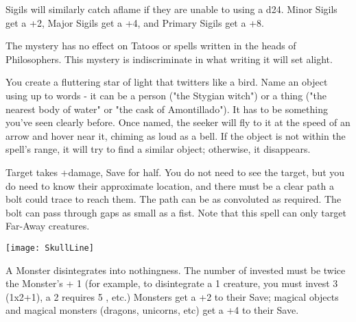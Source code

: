 {Sigils will similarly catch aflame if they are unable to \RS using a d24.  Minor Sigils get a +2, Major Sigils get a +4, and Primary Sigils get a +8.  

The mystery has no effect on Tatoos or spells written in the heads of Philosophers.  This mystery is indiscriminate in what writing it will set alight.


\MYSTERY [
  Name = Sonorous Seeker,
  Link = arcana-mystery-sonorous-seeker,
  Paradigm = Prophesy,
  Save = N,
  Duration = \SUM Minutes,
  Target = See Below
]

You create a fluttering star of light that twitters like a bird.  Name an object using up to \DICE words - it can be a person ("the Stygian witch") or a thing ("the nearest body of water" or "the cask of Amontillado").  It has to be something you've seen clearly before.  Once named, the seeker will fly to it at the speed of an arrow and hover near it, chiming as loud as a bell.  If the object is not within the spell's range, it will try to find a similar object; otherwise, it disappears.


\MYSTERY [
  Name = Doombolt,
  Link = arcana-mystery-doombolt,
  Paradigm = Force,
  Save = Y (half),
  Duration = Instant,
  Target = Far-Away Target(s)
]

Target takes \SUMDICE+\DICE damage, Save for half. You do not need to see the target, but you do need to know their approximate location, and there must be a clear path a bolt could trace to reach them. The path can be as convoluted as required. The bolt can pass through gaps as small as a fist.  Note that this spell can only target Far-Away creatures.

  \begin{center}
  \texttt{[image: SkullLine]}
  \end{center}



\MYSTERY [
  Name = Gaze of the Void,
  Link = arcana-mystery-gaze-of-the-void,
  Paradigm = Entropy,
  Save = Y (neg.),
  Duration = Instant,
  Target = Nearby or Far-Away Target(s)
]

A Monster disintegrates into nothingness. The number of \DICE invested must be twice the Monster's \HD + 1 (for example, to disintegrate a 1 \HD creature, you must invest 3 \DICE (1x2+1), a 2 \HD requires 5 \DICE, etc.) Monsters get a +2 to their Save; magical objects and magical monsters (dragons, unicorns, etc) get a +4 to their Save.



}
